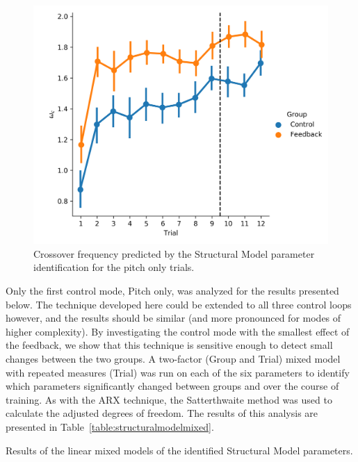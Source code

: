 \begin{figure}[tb]
    \centering
    \includegraphics[width=0.8\linewidth]{figures/Modeling/wc_group.png}
    \caption[Crossover frequency (Structural Model)]{Crossover frequency predicted by the Structural Model parameter identification for the pitch only trials.}
    \label{fig:sm_crossover}
\end{figure}

Only the first control mode, Pitch only, was analyzed for the results presented below.
The technique developed here could be extended to all three control loops however, and the results should be similar (and more pronounced for modes of higher complexity).
By investigating the control mode with the smallest effect of the feedback, we show that this technique is sensitive enough to detect small changes between the two groups.
A two-factor (Group and Trial) mixed model with repeated measures (Trial) was run on each of the six parameters to identify which parameters significantly changed between groups and over the course of training.
As with the ARX technique, the Satterthwaite method was used to calculate the adjusted degrees of freedom.
The results of this analysis are presented in Table~\ref{table:structuralmodelmixed}.

\begin{table}[tb]
    \centering
    \caption[Results of the linear mixed models of the identified Structural Model parameters]{Results of the linear mixed models of the identified Structural Model parameters.}
    \label{table:structuralmodelmixed}
\end{table}

